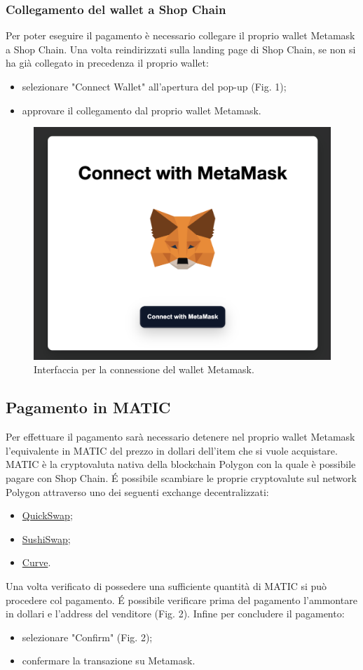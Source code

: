 \documentclass[a4paper, 12pt]{article}
\begin{document}
\subsubsection{Collegamento del wallet a Shop Chain}
Per poter eseguire il pagamento è necessario collegare il proprio wallet Metamask a Shop Chain. Una volta reindirizzati sulla landing page di Shop Chain, se non si ha già collegato in precedenza il proprio wallet:
\begin {itemize}
\item selezionare "Connect Wallet" all'apertura del pop-up (Fig. 1);
\item approvare il collegamento dal proprio wallet Metamask.
\end{itemize}

\FloatBarrier
\begin{figure}
\centering
\includegraphics[width=0.5\linewidth]{img/connessione_wallet.png}
\caption{Interfaccia per la connessione del wallet Metamask.}
\end{figure}
\FloatBarrier

\subsection{Pagamento in MATIC}
Per effettuare il pagamento sarà necessario detenere nel proprio wallet Metamask l'equivalente in MATIC del prezzo in dollari dell'item che si vuole acquistare. MATIC è la cryptovaluta nativa della blockchain Polygon con la quale è possibile pagare con Shop Chain. É possibile scambiare le proprie cryptovalute sul network Polygon attraverso uno dei seguenti exchange decentralizzati:

\begin{itemize}
\item \href{https://www.quickswap.exchange}{QuickSwap};
\item \href{https://app.sushi.com/}{SushiSwap};
\item \href{https://polygon.curve.fi/}{Curve}.
\end{itemize}
Una volta verificato di possedere una sufficiente quantità di MATIC si può procedere col pagamento. É possibile verificare prima del pagamento l'ammontare in dollari e l'address del venditore (Fig. 2). Infine per concludere il pagamento:
\begin{itemize}
\item selezionare "Confirm" (Fig. 2);
\item confermare la transazione su Metamask.
\end{itemize}
\end{document}
